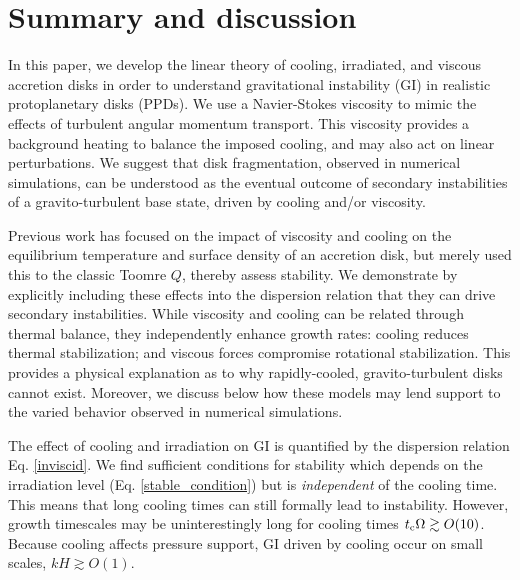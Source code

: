 \section{Summary and discussion}\label{summary}
In this paper, we develop the linear theory of cooling, irradiated, 
and viscous accretion disks in order to understand gravitational 
instability (GI) in realistic protoplanetary disks (PPDs). 
We use a Navier-Stokes viscosity to mimic the effects of
turbulent angular momentum transport. 
This viscosity provides a background heating to balance the imposed cooling,  
and may also act on linear perturbations. %
We suggest that disk fragmentation, observed in numerical simulations, 
can be understood as the eventual outcome of secondary
instabilities of a gravito-turbulent base state, driven by cooling
and/or viscosity. 


Previous work has focused on the impact of viscosity and 
cooling on the equilibrium temperature and surface density of an 
accretion disk, but merely used this to  the classic Toomre $Q$,
thereby assess stability. %
We demonstrate by explicitly including these effects into the
dispersion relation that they can drive secondary instabilities.
While viscosity and cooling can be related through thermal
balance, they independently enhance growth rates: cooling reduces
thermal stabilization; and viscous forces compromise rotational
stabilization. This provides a physical explanation as to why
rapidly-cooled, gravito-turbulent disks cannot exist. Moreover, we discuss below how
these models may lend support to the varied behavior observed in numerical simulations.


The effect of cooling and irradiation on GI is quantified by the 
dispersion relation Eq. \ref{inviscid}. 
We find sufficient conditions for stability which  
depends on the irradiation level (Eq. \ref{stable_condition}) but is 
\emph{independent} of the cooling time. 
This means that long cooling times can still  
formally lead to instability. However, growth timescales may be 
uninterestingly long for cooling times $t_\mathrm{c}\Omega\gtrsim 
O(10)$. Because cooling affects pressure support, GI driven by cooling
occur on small scales, $kH\gtrsim O(1)$.   

